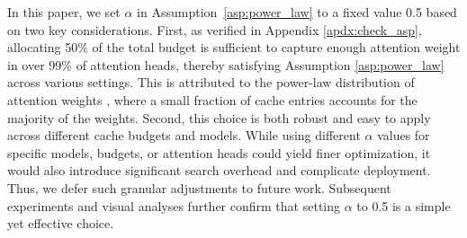 In this paper, we set $\alpha$ in Assumption~\ref{asp:power_law} to a fixed value 0.5 based on two key considerations. First, as verified in Appendix \ref{apdx:check_asp}, allocating 50\% of the total budget is sufficient to capture enough attention weight in over 99\% of attention heads, thereby satisfying Assumption \ref{asp:power_law} across various settings. This is attributed to the power-law distribution of attention weights \citep{h2o}, where a small fraction of cache entries accounts for the majority of the weights.
Second, this choice is both robust and easy to apply across different cache budgets and models. While using different $\alpha$ values for specific models, budgets, or attention heads could yield finer optimization, it would also introduce significant search overhead and complicate deployment. Thus, we defer such granular adjustments to future work.  Subsequent experiments and visual analyses further confirm that setting $\alpha$ to 0.5 is a simple yet effective choice.


